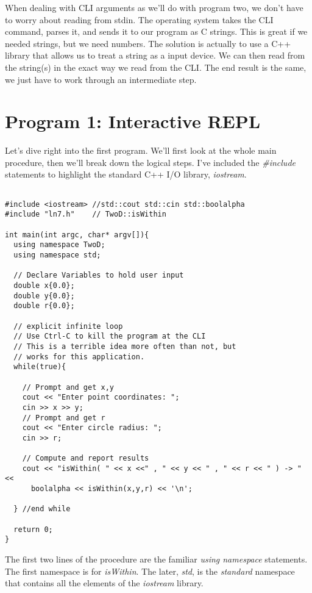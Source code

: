 \documentclass[]{tufte-handout}
\begin{document}
When dealing with CLI arguments as we'll do with program two, we don't have to worry about reading from stdin. The operating system takes the CLI command, parses it, and sends it to our program as C strings.  This is great if we needed strings, but we need numbers. The solution is actually to use a C++ library that allows us to treat a string as a input device. We can then read from the string(s) in the exact way we read from the CLI. The end result is the same, we just have to work through an intermediate step. 

\section{Program 1: Interactive REPL}

Let's dive right into the first program. We'll first look at the whole main procedure, then we'll break down the logical steps. I've included the \textit{\#include} statements to highlight the standard C++ I/O library, \textit{iostream}. 

\begin{verbatim}

#include <iostream> //std::cout std::cin std::boolalpha
#include "ln7.h"    // TwoD::isWithin

int main(int argc, char* argv[]){
  using namespace TwoD;
  using namespace std;

  // Declare Variables to hold user input
  double x{0.0};
  double y{0.0};
  double r{0.0};

  // explicit infinite loop
  // Use Ctrl-C to kill the program at the CLI
  // This is a terrible idea more often than not, but
  // works for this application.
  while(true){
     
    // Prompt and get x,y
    cout << "Enter point coordinates: ";
    cin >> x >> y;
    // Prompt and get r
    cout << "Enter circle radius: ";
    cin >> r;
    
    // Compute and report results
    cout << "isWithin( " << x <<" , " << y << " , " << r << " ) -> " <<
      boolalpha << isWithin(x,y,r) << '\n';
      
  } //end while

  return 0;
}
\end{verbatim}

The first two lines of the procedure are the familiar \textit{using namespace} statements. The first namespace is for \textit{isWithin}. The later, \textit{std}, is the \textit{standard} namespace that contains all the elements of the \textit{iostream} library. 
\end{document}
